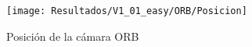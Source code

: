 \begin{figure}[H]
	\centering
	\texttt{[image: Resultados/V1\_01\_easy/ORB/Posicion]}
	\caption{Posición de la cámara ORB}
	\label{imagen:Resultados/V1_01_easy/ORB/Posicion}
\end{figure}



%
%
%
%
%
%
%
%

%
%
%
%
%
%
%
%



